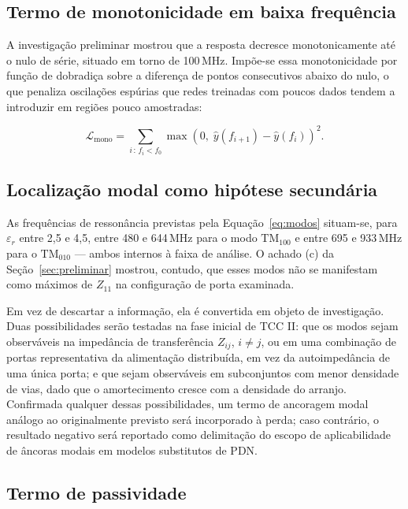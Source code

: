 \subsection{Termo de monotonicidade em baixa frequência}
\label{subsec:l_mono}

A investigação preliminar mostrou que a resposta decresce monotonicamente até o
nulo de série, situado em torno de 100\,MHz. Impõe-se essa monotonicidade por
função de dobradiça sobre a diferença de pontos consecutivos abaixo do nulo, o
que penaliza oscilações espúrias que redes treinadas com poucos dados tendem a
introduzir em regiões pouco amostradas:

\begin{equation}
\mathcal{L}_{\text{mono}} = \sum_{i \,:\, f_i < f_0}
   \max\!\left(0,\; \hat{y}(f_{i+1}) - \hat{y}(f_i)\right)^2 .
\label{eq:l_mono}
\end{equation}

\subsection{Localização modal como hipótese secundária}
\label{subsec:modal}

As frequências de ressonância previstas pela Equação~\ref{eq:modos} situam-se,
para $\varepsilon_r$ entre 2{,}5 e 4{,}5, entre 480 e 644\,MHz para o modo
$\text{TM}_{100}$ e entre 695 e 933\,MHz para o $\text{TM}_{010}$ — ambos
internos à faixa de análise. O achado (c) da Seção~\ref{sec:preliminar} mostrou,
contudo, que esses modos não se manifestam como máximos de $Z_{11}$ na
configuração de porta examinada.

Em vez de descartar a informação, ela é convertida em objeto de investigação. Duas
possibilidades serão testadas na fase inicial de TCC II: que os modos sejam
observáveis na impedância de transferência $Z_{ij}$, $i \neq j$, ou em uma
combinação de portas representativa da alimentação distribuída, em vez da
autoimpedância de uma única porta; e que sejam observáveis em subconjuntos com
menor densidade de vias, dado que o amortecimento cresce com a densidade do
arranjo. Confirmada qualquer dessas possibilidades, um termo de ancoragem modal
análogo ao originalmente previsto será incorporado à perda; caso contrário, o
resultado negativo será reportado como delimitação do escopo de aplicabilidade
de âncoras modais em modelos substitutos de PDN.

\subsection{Termo de passividade}

